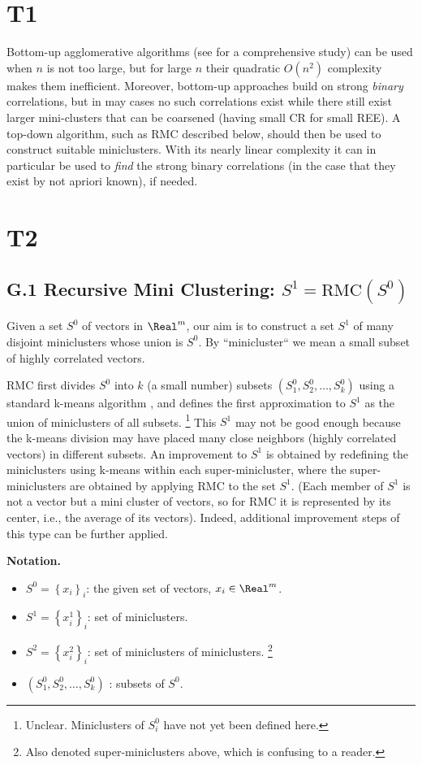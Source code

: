\documentclass{article} %
\begin{document}
\section{T1}
Bottom-up agglomerative algorithms (see \cite{17} for a comprehensive study) can be used when $n$ is not too large, but for large $n$ their quadratic $O(n^2)$ complexity makes them inefficient. Moreover, bottom-up approaches build on strong {\it binary} correlations, but in may cases no such correlations exist while there still exist larger mini-clusters that can be coarsened (having small CR for small REE). A top-down algorithm, such as RMC described below, should then be used to construct suitable miniclusters. With its nearly linear complexity it can in particular be used to {\it find} the strong binary correlations (in the case that they exist by not apriori known), if needed.

\section{T2}
\subsection{G.1 Recursive Mini Clustering: $S^1 = \text{RMC}(S^0)$}
Given a set $S^0$ of vectors in $\Real^m$, our aim is to construct a set $S^1$ of many disjoint miniclusters whose union is $S^0$. By ``minicluster`` we mean a small subset of highly correlated vectors.

RMC first divides $S^0$ into $k$ (a small number) subsets $(S^0_1,S^0_2,\dots,S^0_k)$ using a standard k-means algorithm \cite{kmeans}, and defines the first approximation to $S^1$ as the union of miniclusters of all subsets. \footnote{Unclear. Miniclusters of $S^0_i$ have not yet been defined here.} This $S^1$ may not be good enough because the k-means division may have placed many close neighbors (highly correlated vectors) in different subsets. An improvement to $S^1$ is obtained by redefining the miniclusters using k-means within each super-minicluster, where the super-miniclusters are obtained by applying RMC to the set $S^1$. (Each member of $S^1$ is not a vector but a mini cluster of vectors, so for RMC it is represented by its center, i.e., the average of its vectors). Indeed, additional improvement steps of this type can be further applied.

{\bf Notation.}
\begin{itemize}
    \item $S^0 = \left\{x_i\right\}_i$: the given set of vectors, $x_i \in \Real^m$.
    \item $S^1 = \left\{x_i^1\right\}_i$: set of miniclusters.
    \item $S^2 = \left\{x_i^2\right\}_i$: set of miniclusters of miniclusters. \footnote{Also denoted super-miniclusters above, which is confusing to a reader.}
    \item $(S^0_1,S^0_2,\dots,S^0_k)$ : subsets of $S^0$.
\end{itemize}
\end{document}
